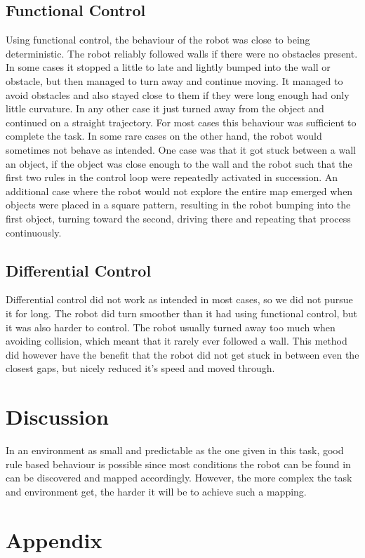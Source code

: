 \documentclass[paper=a4, fontsize=12pt]{scrartcl}	%
\numberwithin{equation}{section}		%
\numberwithin{figure}{section}			%
\numberwithin{table}{section}				%
\begin{document}
\subsection{Functional Control}
Using functional control, the behaviour of the robot was close to being deterministic. The robot reliably followed walls if there were no obstacles present. In some cases it stopped a little to late and lightly bumped into the wall or obstacle, but then managed to turn away and continue moving. It managed to avoid obstacles and also stayed close to them if they were long enough had only little curvature. In any other case it just turned away from the object and continued on a straight trajectory. For most cases this behaviour was sufficient to complete the task. In some rare cases on the other hand, the robot would sometimes not behave as intended. One case was that it got stuck between a wall an object, if the object was close enough to the wall and the robot such that the first two rules in the control loop were repeatedly activated in succession. An additional case where the robot would not explore the entire map emerged when objects were placed in a square pattern, resulting in the robot bumping into the first object, turning toward the second, driving there and repeating that process continuously.
\subsection{Differential Control}
Differential control did not work as intended in most cases, so we did not pursue it for long. The robot did turn smoother than it had using functional control, but it was also harder to control. The robot usually turned away too much when avoiding collision, which meant that it rarely ever followed a wall. This method did however have the benefit that the robot did not get stuck in between even the closest gaps, but nicely reduced it's speed and moved through.
\section{Discussion}
In an environment as small and predictable as the one given in this task, good rule based behaviour is possible since most conditions the robot can be found in can be discovered and mapped accordingly. However, the more complex the task and environment get, the harder it will be to achieve such a mapping.
\section{Appendix}

\end{document}
